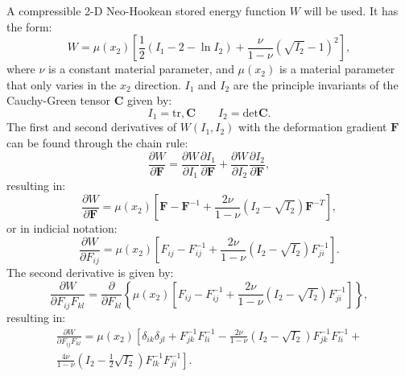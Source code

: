 \documentclass[11pt]{article}
\begin{document}
A compressible 2-D Neo-Hookean stored energy function $W$ will be used. It has the form:
\begin{equation} \label{eq:energyFunction}
W=\mu(x_2)\left[\frac{1}{2}(I_1 - 2- \ln{I_2}) + \frac{\nu}{1-\nu}(\sqrt{I_2} - 1)^2\right],
\end{equation}
where $\nu$ is a constant material parameter, and $\mu(x_2)$ is a material parameter that only varies in the $x_2$ direction. $I_1$ and $I_2$ are the principle invariants of the Cauchy-Green tensor $\mathbf{C}$ given by:
\begin{equation} \label{eq:I_functions}
I_1 = \mathrm{tr}, \mathbf{C} \qquad I_2 = \mathrm{det} \mathbf{C}.
\end{equation}
The first and second derivatives of $W(I_1,I_2)$ with the deformation gradient $\mathbf{F}$ can be found through the chain rule:
\begin{equation} \label{eq:dW_dF_chain}
\frac{\partial W}{\partial \mathbf{F}} = \frac{\partial W}{\partial I_1}\frac{\partial I_1}{\partial \mathbf{F}} + \frac{\partial W}{\partial I_2}\frac{\partial I_2}{\partial \mathbf{F}},
\end{equation}
resulting in:
\begin{equation} \label{eq:dW_dF}
\frac{\partial W}{\partial \mathbf{F}} = \mu(x_2)\left[\mathbf{F} - \mathbf{F}^{-1} + \frac{2\nu}{1-\nu}(I_2 - \sqrt{I_2})\mathbf{F}^{-T}\right],
\end{equation}
or in indicial notation:
\begin{equation} \label{eq:dW_dF_index}
\frac{\partial W}{\partial F_{ij}} = \mu(x_2)\left[F_{ij} - F^{-1}_{ij} + \frac{2\nu}{1-\nu}(I_2 - \sqrt{I_2})F^{-1}_{ji}\right].
\end{equation}
The second derivative is given by:
\begin{equation} \label{eq:d2W_dFF_pre}
\frac{\partial W}{\partial F_{ij}F_{kl}} = \frac{\partial}{\partial F_{kl}}\left\{\mu(x_2)\left[F_{ij} - F^{-1}_{ij} + \frac{2\nu}{1-\nu}(I_2 - \sqrt{I_2})F^{-1}_{ji}\right]\right\},
\end{equation}
resulting in:
\begin{equation} \label{eq:d2W_dFF}
\begin{split}
\frac{\partial W}{\partial F_{ij}F_{kl}} = \mu(x_2)\left[\delta_{ik}\delta_{jl} + F^{-1}_{jk}F^{-1}_{li} -
\frac{2\nu}{1-\nu}(I_2 - \sqrt{I_2})F^{-1}_{jk}F^{-1}_{li} \right. + \\
 \left. \frac{4\nu}{1- \nu}(I_2 - \frac{1}{2}\sqrt{I_2})F^{-1}_{lk}F^{-1}_{ji}\right].
\end{split}
\end{equation} 
\end{document}
